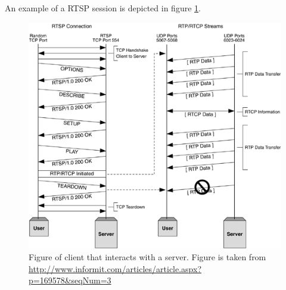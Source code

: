 An example of a RTSP session is depicted in figure \ref{fig:design:rtsp:example}.
\begin{figure}[H]
	\centering
	\includegraphics[width=\textwidth]{figures/rtsp_example}
	\caption{Figure of client that interacts with a server. Figure is taken from \url{http://www.informit.com/articles/article.aspx?p=169578&seqNum=3}}
	\label{fig:design:rtsp:example}
\end{figure}

